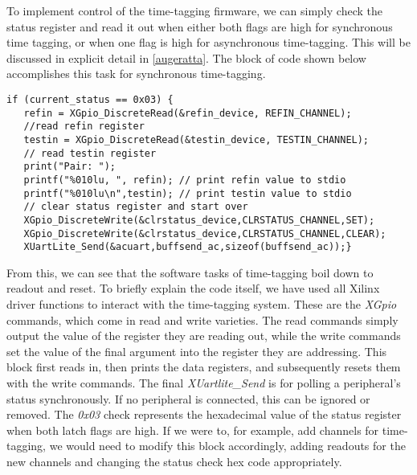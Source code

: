 To implement control of the time-tagging firmware, we can simply check the status register and read it out when either both flags are high for synchronous time tagging, or when one flag is high for asynchronous time-tagging. This will be discussed in explicit detail in \autoref{augeratta}. The block of code shown below accomplishes this task for synchronous time-tagging.
\begin{small}
\begin{singlespace}
\label{statcheck}
\begin{verbatim}
if (current_status == 0x03) {
   refin = XGpio_DiscreteRead(&refin_device, REFIN_CHANNEL); 
   //read refin register
   testin = XGpio_DiscreteRead(&testin_device, TESTIN_CHANNEL); 
   // read testin register
   print("Pair: ");
   printf("%010lu, ", refin); // print refin value to stdio
   printf("%010lu\n",testin); // print testin value to stdio
   // clear status register and start over
   XGpio_DiscreteWrite(&clrstatus_device,CLRSTATUS_CHANNEL,SET); 
   XGpio_DiscreteWrite(&clrstatus_device,CLRSTATUS_CHANNEL,CLEAR);
   XUartLite_Send(&acuart,buffsend_ac,sizeof(buffsend_ac));}
\end{verbatim} 
\end{singlespace}
\end{small}
From this, we can see that the software tasks of time-tagging boil down to readout and reset. To briefly explain the code itself, we have used all Xilinx driver functions to interact with the time-tagging system. These are the \textit{XGpio} commands, which come in read and write varieties. The read commands simply output the value of the register they are reading out, while the write commands set the value of the final argument into the register they are addressing. This block first reads in, then prints the data registers, and subsequently resets them with the write commands. The final \textit{XUartlite\_Send} is for polling a peripheral's status synchronously. If no peripheral is connected, this can be ignored or removed. The \textit{0x03} check represents the hexadecimal value of the status register when both latch flags are high. If we were to, for example, add channels for time-tagging, we would need to modify this block accordingly, adding readouts for the new channels and changing the status check hex code appropriately. 

